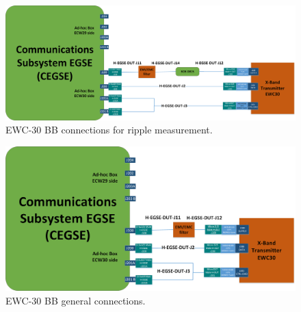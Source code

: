 \begin{figure}[H]
	\centering
	  \includegraphics[width=.9\linewidth]{figuras/CEGSE_EWC30SetupA.png}  
	  \caption{EWC-30 BB connections for ripple measurement.}
	\label{fig:ewc30_bb}
\end{figure}

\begin{figure}[H]
	\centering
	  \includegraphics[width=.7\linewidth]{figuras/CEGSE_EWC30SetupB.png}  
	  \caption{EWC-30 BB general connections.}
	\label{fig:ewc30_bb}
\end{figure}

